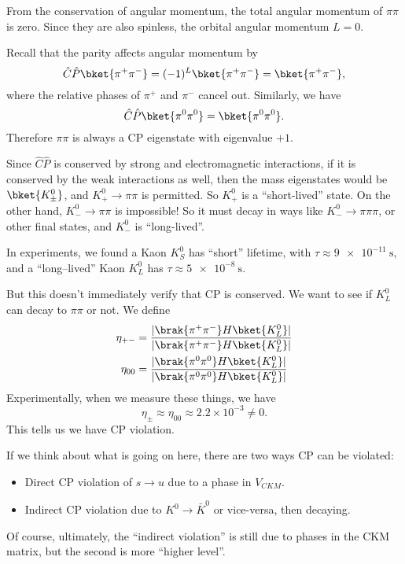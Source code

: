 \documentclass[a4paper]{article}
\begin{document}
From the conservation of angular momentum, the total angular momentum of $\pi \pi$ is zero. Since they are also spinless, the orbital angular momentum $L = 0$.

Recall that the parity affects angular momentum by
\[
  \hat{C}\hat{P} \bket{\pi^+\pi^-} = (-1)^L \bket{\pi^+\pi^-} = \bket{\pi^+ \pi^-},
\]
where the relative phases of $\pi^+$ and $\pi^-$ cancel out. Similarly, we have
\[
  \hat{C}\hat{P} \bket{\pi^0 \pi^0} = \bket{\pi^0 \pi^0}.
\]
Therefore $\pi \pi$ is always a CP eigenstate with eigenvalue $+1$.

Since $\hat{C}\hat{P}$ is conserved by strong and electromagnetic interactions, if it is conserved by the weak interactions as well, then the mass eigenstates would be $\bket{K_{\pm}^0}$, and $K^0_+ \to \pi \pi$ is permitted. So $K^0_+$ is a ``short-lived'' state. On the other hand, $K_-^0 \to \pi \pi$ is impossible! So it must decay in ways like $K_-^0 \to \pi \pi \pi$, or other final states, and $K_-^0$ is ``long-lived''.

In experiments, we found a Kaon $K^0_S$  has ``short'' lifetime, with $\tau \approx \SI{9e-11}{\second}$, and a  ``long--lived'' Kaon $K_L^0$ has $\tau \approx \SI{5e-8}{\second}$.

But this doesn't immediately verify that CP is conserved. We want to see if $K_L^0$ can decay to $\pi \pi$ or not. We define
\begin{align*}
  \eta_{+ -} &= \frac{|\brak{\pi^+ \pi^-}H \bket{K_L^0}|}{|\brak{\pi^+ \pi^-}H \bket{K_L^0}|}\\
  \eta_{0 0} &= \frac{|\brak{\pi^0 \pi^0}H \bket{K_L^0}|}{|\brak{\pi^0 \pi^0}H \bket{K_L^0}|}
\end{align*}
Experimentally, when we measure these things, we have
\[
  \eta_{\pm} \approx \eta_{00} \approx 2.2\times 10^{-3} \not= 0.
\]
This tells us we have CP violation.

If we think about what is going on here, there are two ways CP can be violated:
\begin{itemize}
  \item Direct CP violation of $s \to u$ due to a phase in $V_{CKM}$.
  \item Indirect CP violation due to $K^0 \to \bar{K}^0$ or vice-versa, then decaying.
\end{itemize}
Of course, ultimately, the ``indirect violation'' is still due to phases in the CKM matrix, but the second is more ``higher level''.
\end{document}

